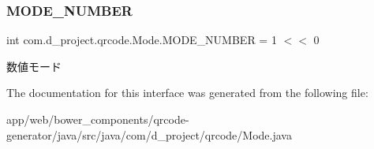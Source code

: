 \subsubsection{\texorpdfstring{M\+O\+D\+E\+\_\+\+N\+U\+M\+B\+ER}{MODE\_NUMBER}}
{\footnotesize\ttfamily int com.\+d\+\_\+project.\+qrcode.\+Mode.\+M\+O\+D\+E\+\_\+\+N\+U\+M\+B\+ER = 1 $<$$<$ 0}

数値モード 

The documentation for this interface was generated from the following file\+:\begin{DoxyCompactItemize}
\item 
app/web/bower\+\_\+components/qrcode-\/generator/java/src/java/com/d\+\_\+project/qrcode/Mode.\+java\end{DoxyCompactItemize}
